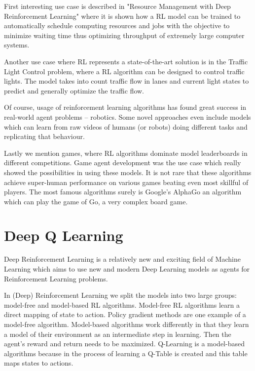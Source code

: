 \documentclass[b5paper]{book}
\begin{document}
First interesting use case is described in "Resource Management with Deep Reinforcement Learning" where it is shown how a RL model can be trained to automatically schedule computing resources and jobs with the objective to minimize waiting time thus optimizing throughput of extremely large computer systems.

Another use case where RL represents a state-of-the-art solution is in the Traffic Light Control problem, where a RL algorithm can be designed to control traffic lights. The model takes into count traffic flow in lanes and current light states to predict and generally optimize the traffic flow.

Of course, usage of reinforcement learning algorithms has found great success in real-world agent problems -- robotics. Some novel approaches even include models which can learn from raw videos of humans (or robots) doing different tasks and replicating that behaviour.

Lastly we mention games, where RL algorithms dominate model leaderboards in different competitions. Game agent development was the use case which really showed the possibilities in using these models. It is not rare that these algorithms achieve super-human performance on various games beating even most skillful of players. The most famous algorithms surely is Google's AlphaGo an algorithm which can play the game of Go, a very complex board game.

\section{Deep Q Learning}



Deep Reinforcement Learning is a relatively new and exciting field of Machine Learning which aims to use new and modern Deep Learning models as agents for Reinforcement Learning problems.

In (Deep) Reinforcement Learning we split the models into two large groups: model-free and model-based RL algorithms. Model-free RL algorithms learn a direct mapping of state to action. Policy gradient methods are one example of a model-free algorithm. Model-based algorithms work differently in that they learn a model of their environment as an intermediate step in learning. Then the agent's reward and return needs to be maximized. Q-Learning is a model-based algorithms because in the process of learning a Q-Table is created and this table maps states to actions.
\end{document}
